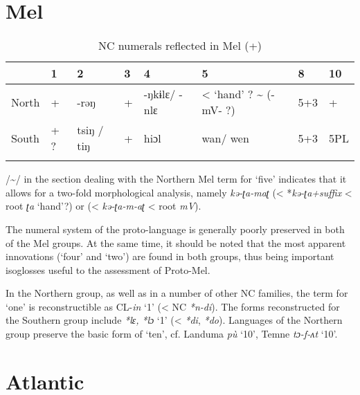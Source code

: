 \clearpage
\section{Mel}%
 

\begin{table}
\caption{\label{tab:5:11} NC numerals reflected in Mel (+)} 
\begin{tabularx}{\textwidth}{llllllll} 
\lsptoprule
& {{1}} &  {{2}} & {{3}} & {{4}} & {5} & {8} & {{10}}\\
\midrule 
{{North}} & {{+}} & {-rəŋ} & {{+}} & {{-ŋkɨlɛ/ -nlɛ}} & {{<} {‘hand’} ? {{\textasciitilde} (-mV- ?)}} & {{5+3}} & {+}\\
{South} & {{+} ?} & {{tsiŋ} {/} {tiŋ}} & {{+}} & {{hiɔl}} & {wan/} {wen} & {5+3} & {{5PL}}\\
\lspbottomrule
\end{tabularx}
/{\textasciitilde}/ in the section dealing with the Northern Mel term for ‘five’ indicates that it allows for a two-fold morphological analysis, namely \textit{kə-ʈa-maʈ} (< *\textit{kə-ʈa+suffix} < root \textit{ʈa} ‘hand’?) or (< \textit{kə-ʈa-m-aʈ} < root \textit{mV}).
\end{table}

The numeral system of the proto-language is generally poorly preserved in both of the Mel groups. At the same time, it should be noted that the most apparent innovations (‘four’ and ‘two’) are found in both groups, thus being important isoglosses useful to the assessment of Proto-Mel.

In the Northern group, as well as in a number of other NC families, the term for ‘one’ is reconstructible as CL-\textit{in} ‘1’ (< NC \textit{*n}\textit{-}\textit{di}). The forms reconstructed for the Southern group include \textit{*l}\textit{ɛ,} \textit{*l}\textit{ɔ} ‘1’ (< \textit{*di}, \textit{*do}). Languages of the Northern group preserve the basic form of ‘ten’, cf. Landuma  \textit{p{\`{u}}} ‘10’, Temne \textit{tɔ-f-ʌt} ‘10’.

\clearpage
\section{Atlantic}%
 
